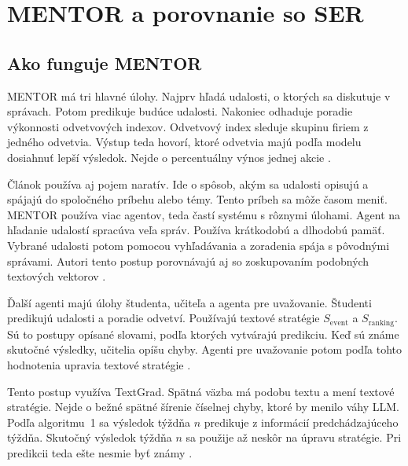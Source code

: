\section{MENTOR a porovnanie so SER}
\subsection{Ako funguje MENTOR}
MENTOR má tri hlavné úlohy. Najprv hľadá udalosti, o ktorých sa diskutuje v správach. Potom predikuje budúce udalosti. Nakoniec odhaduje poradie výkonnosti odvetvových indexov. Odvetvový index sleduje skupinu firiem z jedného odvetvia. Výstup teda hovorí, ktoré odvetvia majú podľa modelu dosiahnuť lepší výsledok. Nejde o percentuálny výnos jednej akcie .

Článok používa aj pojem naratív. Ide o spôsob, akým sa udalosti opisujú a spájajú do spoločného príbehu alebo témy. Tento príbeh sa môže časom meniť. MENTOR používa viac agentov, teda častí systému s rôznymi úlohami. Agent na hľadanie udalostí spracúva veľa správ. Používa krátkodobú a dlhodobú pamäť. Vybrané udalosti potom pomocou vyhľadávania a zoradenia spája s pôvodnými správami. Autori tento postup porovnávajú aj so zoskupovaním podobných textových vektorov .

Ďalší agenti majú úlohy študenta, učiteľa a agenta pre uvažovanie. Študenti predikujú udalosti a poradie odvetví. Používajú textové stratégie $S_{\mathrm{event}}$ a $S_{\mathrm{ranking}}$. Sú to postupy opísané slovami, podľa ktorých vytvárajú predikciu. Keď sú známe skutočné výsledky, učitelia opíšu chyby. Agenti pre uvažovanie potom podľa tohto hodnotenia upravia textové stratégie .

Tento postup využíva TextGrad. Spätná väzba má podobu textu a mení textové stratégie. Nejde o bežné spätné šírenie číselnej chyby, ktoré by menilo váhy LLM. Podľa algoritmu~1 sa výsledok týždňa $n$ predikuje z informácií predchádzajúceho týždňa. Skutočný výsledok týždňa $n$ sa použije až neskôr na úpravu stratégie. Pri predikcii teda ešte nesmie byť známy .



